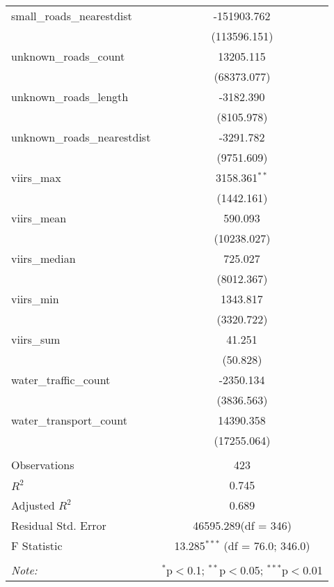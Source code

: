 \begin{table}[!htbp]
\begin{tabular}{@{\extracolsep{5pt}}lc}
 small_roads_nearestdist & -151903.762$^{}$ \\
  & (113596.151) \\
 unknown_roads_count & 13205.115$^{}$ \\
  & (68373.077) \\
 unknown_roads_length & -3182.390$^{}$ \\
  & (8105.978) \\
 unknown_roads_nearestdist & -3291.782$^{}$ \\
  & (9751.609) \\
 viirs_max & 3158.361$^{**}$ \\
  & (1442.161) \\
 viirs_mean & 590.093$^{}$ \\
  & (10238.027) \\
 viirs_median & 725.027$^{}$ \\
  & (8012.367) \\
 viirs_min & 1343.817$^{}$ \\
  & (3320.722) \\
 viirs_sum & 41.251$^{}$ \\
  & (50.828) \\
 water_traffic_count & -2350.134$^{}$ \\
  & (3836.563) \\
 water_transport_count & 14390.358$^{}$ \\
  & (17255.064) \\
\hline \\[-1.8ex]
 Observations & 423 \\
 $R^2$ & 0.745 \\
 Adjusted $R^2$ & 0.689 \\
 Residual Std. Error & 46595.289(df = 346)  \\
 F Statistic & 13.285$^{***}$ (df = 76.0; 346.0) \\
\hline
\hline \\[-1.8ex]
\textit{Note:} & \multicolumn{1}{r}{$^{*}$p$<$0.1; $^{**}$p$<$0.05; $^{***}$p$<$0.01} \\
\end{tabular}
\end{table}
